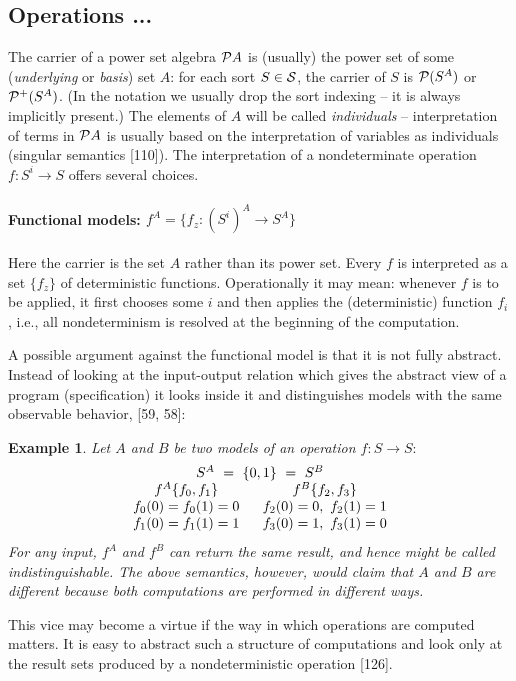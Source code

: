 \documentclass[10pt]{article}
\newcommand{\PSet}{{\cal P}}
\newcommand{\into}{\mathrel{\rightarrow}}
\newcommand{\Sorts}{{\cal S}}
\newcounter{CLAIM}[section]
\newtheorem{Example}[CLAIM]{Example}
\begin{document}
\subsection{Operations ...} 
The carrier of a power set algebra 
$\PSet A$ is (usually) the power set of some ({\em underlying} or {\em
basis}) set $A$: for each sort $S\in\Sorts$, the 
carrier of $S$ is $\PSet(S^{A})$ or $\PSet^{+}(S^{A})$. 
(In the notation we usually drop the 
sort indexing --  it is always implicitly present.) The elements 
of $A$ will be called {\em individuals}  --  
 interpretation of terms in $\PSet A$ is usually based on the 
interpretation of variables as individuals (singular semantics 
[110]). The interpretation of a nondeterminate operation 
$f:S^{i}\into S$ offers several choices.   

\paragraph{Functional models: $f^{A}= \{f_{z}: (S^{i})^{A}\into 
S^{A}\} $}
 Here the carrier is the set $A$ 
rather than its power set. Every $f$ is interpreted as a set 
$\{f_{z}\}$ of deterministic functions. Operationally it may 
mean: whenever $f$
 is to be applied, it first chooses some $i$ and then applies the 
(deterministic) function $f_{i}$, i.e., all 
nondeterminism is resolved at the beginning of the computation.  

A possible argument against the functional model is that it is not 
fully abstract. Instead of looking at the input-output relation which 
gives the abstract view of a program (specification) it looks inside 
it and distinguishes models with the same observable behavior, [59, 58]: 

\begin{Example}\label{ex:22} %
Let $A$ and $B$ be two models of an operation $f:S\into S:$
\[ \begin{array}{c@{\ \ \ \ \ }c}
\multicolumn{2}{c}{ S^{A}\ =\ \{0,1\}\ =\ S^{B}} \\
 f^{A}\{f_{0}, f_{1}\} &  f^{B}\{f_{2}, f_{3}\} \\
 f_{0}(0)=f_{0}(1) = 0 & f_{2}(0)=0,\  f_{2}(1) = 1 \\
  f_{1}(0)=f_{1}(1) = 1 & f_{3}(0)=1,\  f_{3}(1) = 0
  \end{array}
\]
 For any input, $f^{A}$ and $f^{B}$ can return the same 
result, and hence might be called indistinguishable. The above 
semantics, however, would claim that $A$ and $B$
 are different because both computations are performed in different 
ways.
\end{Example}
This vice may become a virtue if the way in which 
operations are computed matters. It is easy to abstract such a 
structure of computations and look only at the result sets produced 
by a nondeterministic operation [126]. 
\end{document}
